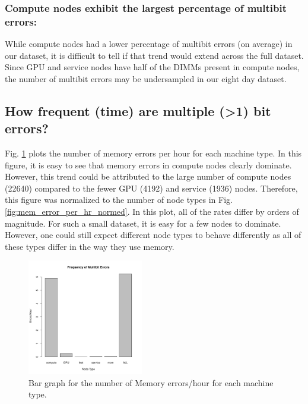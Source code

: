 \subsubsection{Compute nodes exhibit the largest percentage of multibit
errors:} While compute nodes had a lower percentage of multibit errors (on
average) in our dataset, it is difficult to tell if that trend would extend
across the full dataset.  Since GPU and service nodes have half of the DIMMs
present in compute nodes, the number of multibit errors may be undersampled in
our eight day dataset.

\subsection{How frequent (time) are multiple (>1) bit errors?}

Fig. \ref{fig:mem_error_per_hr} plots the number of memory errors per hour for
each machine type.  In this figure, it is easy to see that memory errors in 
compute nodes clearly dominate.  However, this trend could be attributed to the
large number of compute nodes (22640) compared to the fewer GPU (4192) and
service (1936) nodes.  Therefore, this figure was normalized to the number of
node types in Fig. \ref{fig:mem_error_per_hr_normed}.  In this plot, all of the
rates differ by orders of magnitude.  For such a small dataset, it is easy for a
few nodes to dominate.  However, one could still expect different node types to
behave differently as all of these types differ in the way they use memory.

\begin{figure}[h]
  \centering
  \includegraphics[width=0.45\textwidth]{images/task2_2}
  \caption{Bar graph for the number of Memory errors/hour for each machine
  type.}\label{fig:mem_error_per_hr}
\end{figure}

